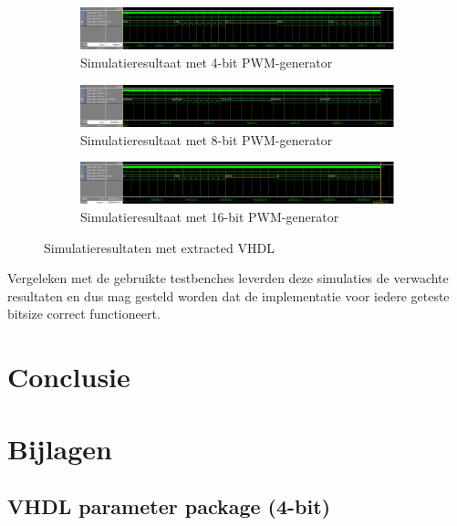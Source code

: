 \documentclass{article}
\begin{document}
\begin{figure}[H]
	\centering
	\begin{subfigure}{\textwidth}
		\includegraphics[width=\textwidth]{resource/pwm_gen_sim_4bit.png}
		\caption{Simulatieresultaat met 4-bit PWM-generator}
		\label{sfig:pwm-sim-4bit}
	\end{subfigure}
	\newline
	\begin{subfigure}{\textwidth}
		\includegraphics[width=\textwidth]{resource/pwm_gen_sim_8bit.png}
		\caption{Simulatieresultaat met 8-bit PWM-generator}
		\label{sfig:pwm-sim-8bit}
	\end{subfigure}
	\newline
	\begin{subfigure}{\textwidth}
		\includegraphics[width=\textwidth]{resource/pwm_gen_sim_16bit.png}
		\caption{Simulatieresultaat met 16-bit PWM-generator}
		\label{sfig:pwm-sim-16bit}
	\end{subfigure}
	\caption{Simulatieresultaten met extracted VHDL}
	\label{fig:pwm-sim}
\end{figure}

Vergeleken met de gebruikte testbenches leverden deze simulaties de verwachte resultaten en dus mag gesteld worden dat de implementatie voor iedere geteste bitsize correct functioneert.

\section{Conclusie}
\label{sec:pwm-conclusie}

\section{Bijlagen}
\label{sec:pwm-bijlagen}

\subsection{VHDL parameter package (4-bit)}
\label{vhdl:pwm-gen-pack}
\end{document}
